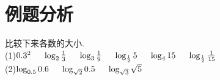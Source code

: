 \section{例题分析}
\begin{example} 比较下来各数的大小.\\
	(1)$0.3^2\hspace{0.5cm} \log_2\frac{1}{3}\hspace{0.5cm}\log_3\frac{1}{9} \hspace{0.5cm} \log_{\frac{1}{2}}5\hspace{0.5cm} \log_4 15 \hspace{0.5cm} \log_{\frac{1}{2}}{\frac{1}{15}}	$~\vspace*{0.6cm}\\
	(2)$\log_{0.5}0.6 \hspace{0.5cm} \log_{\sqrt{2}}0.5 \hspace{0.5cm} \log_{\sqrt{3}}\sqrt{5}$\\
\end{example}

